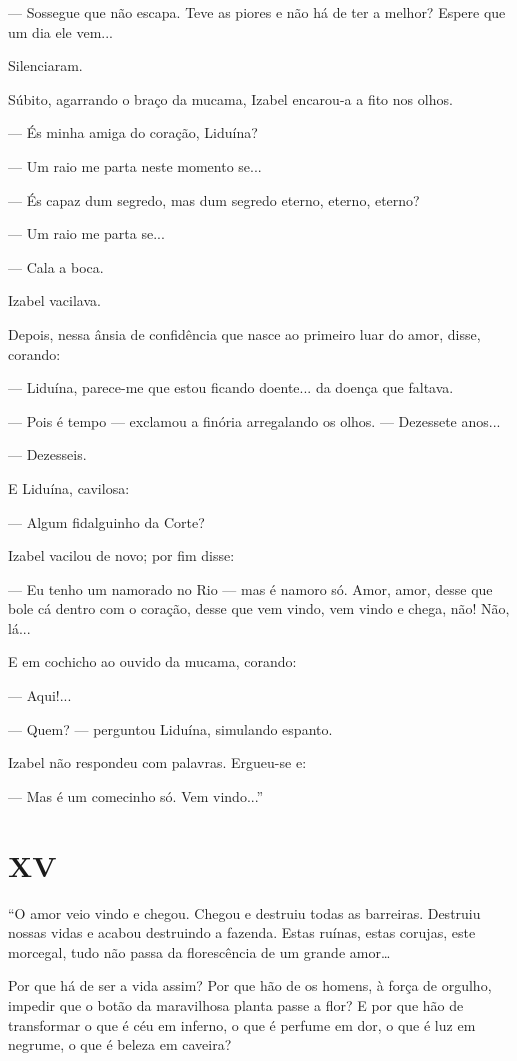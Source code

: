 --- Sossegue que não escapa. Teve as piores e não há de ter a melhor?
Espere que um dia ele vem...

Silenciaram.

Súbito, agarrando o braço da mucama, Izabel encarou-a a fito nos olhos.

--- És minha amiga do coração, Liduína?

--- Um raio me parta neste momento se...

--- És capaz dum segredo, mas dum segredo eterno, eterno, eterno?

--- Um raio me parta se...

--- Cala a boca.

Izabel vacilava.

Depois, nessa ânsia de confidência que nasce ao primeiro luar do amor,
disse, corando:

--- Liduína, parece-me que estou ficando doente... da doença que
faltava.

--- Pois é tempo --- exclamou a finória arregalando os olhos. ---
Dezessete anos...

--- Dezesseis.

E Liduína, cavilosa:

--- Algum fidalguinho da Corte?

Izabel vacilou de novo; por fim disse:

--- Eu tenho um namorado no Rio --- mas é namoro só. Amor, amor, desse
que bole cá dentro com o coração, desse que vem vindo, vem vindo e
chega, não! Não, lá...

E em cochicho ao ouvido da mucama, corando:

--- Aqui!...

--- Quem? --- perguntou Liduína, simulando espanto.

Izabel não respondeu com palavras. Ergueu-se e:

--- Mas é um comecinho só. Vem vindo...''

\section{XV}

``O amor veio vindo e chegou. Chegou e destruiu todas as barreiras.
Destruiu nossas vidas e acabou destruindo a fazenda. Estas ruínas, estas
corujas, este morcegal, tudo não passa da florescência de um grande
amor\ldots{}

Por que há de ser a vida assim? Por que hão de os homens, à força de
orgulho, impedir que o botão da maravilhosa planta passe a flor? E por
que hão de transformar o que é céu em inferno, o que é perfume em dor, o
que é luz em negrume, o que é beleza em caveira?

